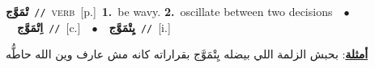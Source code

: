 \documentclass[10pt,a4paper,twoside]{article} %
\begin{document}
\begin{multicols}{2}
{\setlength\topsep{0pt}\textbf{\foreignlanguage{arabic}{تْمَوَّج}}\ {\color{gray}\texttt{//}\color{black}}\ \textsc{verb}\ [p.]\ \textbf{1.}~be wavy.  \textbf{2.}~oscillate between two decisions\ \ $\bullet$\ \ \setlength\topsep{0pt}\textbf{\foreignlanguage{arabic}{اِتْمَوَّج}}\ {\color{gray}\texttt{//}\color{black}}\ [c.]\ \ $\bullet$\ \ \setlength\topsep{0pt}\textbf{\foreignlanguage{arabic}{يِتْمَوَّج}}\ {\color{gray}\texttt{//}\color{black}}\ [i.]\  \begin{flushright}\color{gray}\foreignlanguage{arabic}{\textbf{\underline{\foreignlanguage{arabic}{أمثلة}}}: بحبش الزلمة اللي بيضله يِتْمَوَّج بقراراته كانه مش عارف وين الله حاطُّه}\end{flushright}\color{black}} \vspace{2mm}


\end{multicols}
\end{document}
